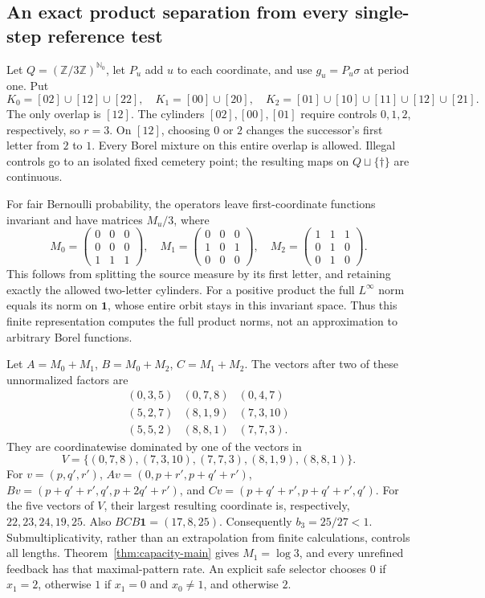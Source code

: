 \documentclass[11pt,reqno]{amsart}
\numberwithin{equation}{section}
\theoremstyle{definition}
\newcommand{\Nzero}{\mathbb N_0}
\newcommand{\one}{\mathbf 1}
\begin{document}
\subsection{An exact product separation from every single-step reference test}
\label{subsec:product-example}
Let $Q=(\mathbb Z/3\mathbb Z)^{\Nzero}$, let $P_u$ add $u$
to each coordinate, and use $g_u=P_u\sigma$ at period one. Put
\[
 K_0=[02]\cup[12]\cup[22],\quad K_1=[00]\cup[20],\quad
 K_2=[01]\cup[10]\cup[11]\cup[12]\cup[21].
\]
The only overlap is $[12]$. The cylinders $[02],[00],[01]$
require controls $0,1,2$, respectively, so $r=3$.
On $[12]$, choosing $0$ or $2$ changes the successor's first
letter from $2$ to $1$. Every Borel mixture on this entire overlap
is allowed. Illegal controls go to an isolated fixed cemetery point;
the resulting maps on $Q\sqcup\{\dagger\}$ are continuous.

For fair Bernoulli probability, the operators leave first-coordinate
functions invariant and have matrices $M_u/3$, where
\[
 M_0=\begin{pmatrix}0&0&0\\0&0&0\\1&1&1\end{pmatrix},\quad
 M_1=\begin{pmatrix}0&0&0\\1&0&1\\0&0&0\end{pmatrix},\quad
 M_2=\begin{pmatrix}1&1&1\\0&1&0\\0&1&0\end{pmatrix}.
\]
This follows from splitting the source measure by its first letter,
and retaining exactly the allowed two-letter cylinders. For a
positive product the full $L^\infty$ norm equals its norm on
$\one$, whose entire orbit stays in this invariant space. Thus this
finite representation computes the full product norms, not an
approximation to arbitrary Borel functions.

Let $A=M_0+M_1$, $B=M_0+M_2$, $C=M_1+M_2$.
The vectors after two of these unnormalized factors are
\[
\begin{array}{ccc}
(0,3,5)&(0,7,8)&(0,4,7)\\
(5,2,7)&(8,1,9)&(7,3,10)\\
(5,5,2)&(8,8,1)&(7,7,3).
\end{array}
\]
They are coordinatewise dominated by one of the vectors in
\[
 V=\{(0,7,8),(7,3,10),(7,7,3),(8,1,9),(8,8,1)\}.
\]
For $v=(p,q',r')$,
$Av=(0,p+r',p+q'+r')$,
$Bv=(p+q'+r',q',p+2q'+r')$, and
$Cv=(p+q'+r',p+q'+r',q')$.
For the five vectors of $V$, their largest resulting coordinate is,
respectively, $22,23,24,19,25$. Also $BCB\one=(17,8,25)$.
Consequently $b_3=25/27<1$. Submultiplicativity, rather than an
extrapolation from finite calculations, controls all lengths.
Theorem~\ref{thm:capacity-main} gives $M_1=\log3$, and every
unrefined feedback has that maximal-pattern rate. An explicit safe
selector chooses $0$ if $x_1=2$, otherwise $1$ if $x_1=0$ and
$x_0\ne1$, and otherwise $2$.
\end{document}
